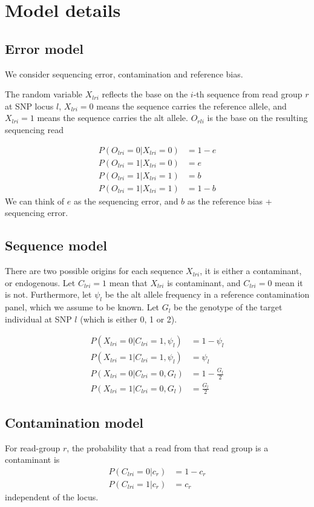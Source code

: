 \documentclass[10pt,a4paper]{article}
\begin{document}
\section*{Model details}
\subsection*{Error model}
We consider sequencing error, contamination and reference bias.

The random variable $X_{lri}$ reflects the base on the $i$-th sequence from read group $r$ at SNP locus $l$, $X_{lri}=0$ means the sequence carries the reference allele, and $X_{lri}=1$ means the sequence carries the alt allele. $O_{rli}$ is the base on the resulting sequencing read

\begin{align}
P(O_{lri}=0 | X_{lri}=0) &= 1-e\nonumber\\
P(O_{lri}=1 | X_{lri}=0) &= e\nonumber\\
P(O_{lri}=1 | X_{lri}=1) &= b\nonumber\\
P(O_{lri}=1 | X_{lri}=1) &= 1-b
\end{align}
We can think of $e$ as the sequencing error, and $b$ as the reference bias + sequencing error.

\subsection*{Sequence model}

There are two possible origins for each sequence $X_{lri}$, it is either a contaminant, or endogenous. 
Let $C_{lri} =1 $ mean that $X_{lri}$ is contaminant, and $C_{lri} =0 $ mean it is not. Furthermore, let $\psi_l$ be the alt allele frequency in a reference contamination panel, which we assume to be known. Let $G_l$ be the genotype of the target individual at SNP $l$ (which is either 0, 1 or 2).

\begin{align}
P(X_{lri} = 0 | C_{lri} = 1, \psi_l) &= 1 - \psi_l\nonumber\\ 
P(X_{lri} = 1 | C_{lri} = 1, \psi_l) &= \psi_l\nonumber\\ 
P(X_{lri} = 0 | C_{lri} = 0, G_l) &= 1 - \frac{G_l}{2}\nonumber\\ 
P(X_{lri} = 1 | C_{lri} = 0, G_l) &= \frac{G_l}{2}
\end{align}

\subsection*{Contamination model}
For read-group $r$, the probability that a read from that read group is a contaminant is 
\begin{align}
P(C_{lri} = 0 | c_r) &= 1-c_r\nonumber\\
P(C_{lri} = 1 | c_r) &= c_r
\end{align}
independent of the locus.
\end{document}
